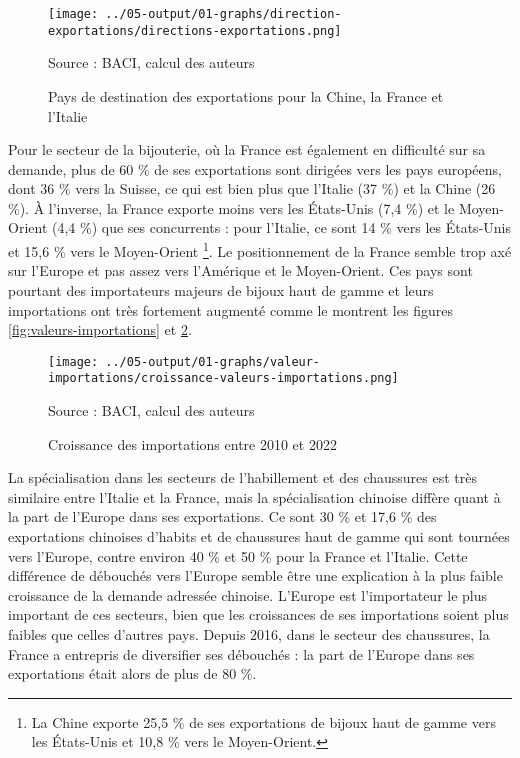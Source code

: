 \documentclass[french,10pt,a4paper]{article}
\begin{document}
\begin{figure}[!h]
  \centering
  \texttt{[image: ../05-output/01-graphs/direction-exportations/directions-exportations.png]}
  \captionsetup{justification=raggedright,singlelinecheck=false, font=small}
  \caption*{Source : BACI, calcul des auteurs}
  \captionsetup{justification=centering, singlelinecheck=true, font=normalsize}
  \caption{Pays de destination des exportations pour la Chine, la France et l'Italie}
  \label{fig:direction-exportations}
\end{figure}

Pour le secteur de la bijouterie, où la France est également en difficulté sur sa demande, plus de 60 \% de ses exportations sont dirigées vers les pays européens, dont 36 \% vers la Suisse, ce qui est bien plus que l'Italie (37 \%) et la Chine (26 \%). À l'inverse, la France exporte moins vers les États-Unis (7,4 \%) et le Moyen-Orient (4,4 \%) que ses concurrents : pour l'Italie, ce sont 14 \% vers les États-Unis et 15,6 \% vers le Moyen-Orient \footnote{La Chine exporte 25,5 \% de ses exportations de bijoux haut de gamme vers les États-Unis et 10,8 \% vers le Moyen-Orient.}. Le positionnement de la France semble trop axé sur l'Europe et pas assez vers l'Amérique et le Moyen-Orient. Ces pays sont pourtant des importateurs majeurs de bijoux haut de gamme et leurs importations ont très fortement augmenté comme le montrent les figures \ref{fig:valeurs-importations} et \ref{fig:croissance-valeurs-importations}.

\begin{figure}[!h]
  \centering
  \texttt{[image: ../05-output/01-graphs/valeur-importations/croissance-valeurs-importations.png]}
  \captionsetup{justification=raggedright,singlelinecheck=false, font=small}
  \caption*{Source : BACI, calcul des auteurs}
  \captionsetup{justification=centering, singlelinecheck=true, font=normalsize}
  \caption{Croissance des importations entre 2010 et 2022}
  \label{fig:croissance-valeurs-importations}
\end{figure}

La spécialisation dans les secteurs de l'habillement et des chaussures est très similaire entre l'Italie et la France, mais la spécialisation chinoise diffère quant à la part de l'Europe dans ses exportations. Ce sont 30 \% et 17,6 \% des exportations chinoises d'habits et de chaussures haut de gamme qui sont tournées vers l'Europe, contre environ 40 \% et 50 \% pour la France et l’Italie. Cette différence de débouchés vers l'Europe semble être une explication à la plus faible croissance de la demande adressée chinoise. L'Europe est l'importateur le plus important de ces secteurs, bien que les croissances de ses importations soient plus faibles que celles d'autres pays. Depuis 2016, dans le secteur des chaussures, la France a entrepris de diversifier ses débouchés : la part de l'Europe dans ses exportations était alors de plus de 80 \%.
\end{document}
